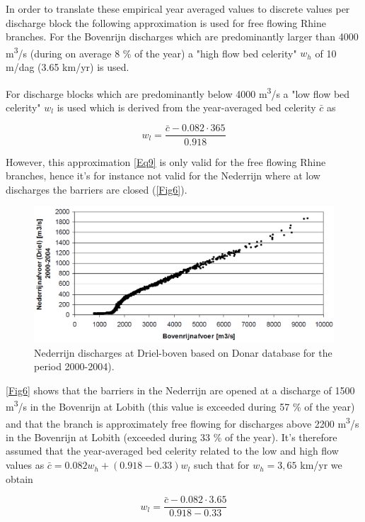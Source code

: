 In order to translate these empirical year averaged values to discrete values per discharge block the following approximation is used for free flowing Rhine branches.
For the Bovenrijn discharges which are predominantly larger than 4000 m\textsuperscript{3}/s (during on average 8 \% of the year) a "high flow bed celerity" $w_h$ of 10 m/dag (3.65 km/yr) is used.

For discharge blocks which are predominantly below 4000 m\textsuperscript{3}/s a "low flow bed celerity" $w_l$ is used which is derived from the year-averaged bed celerity $\bar{c}$ as

\begin{equation}
w_l = \frac{\bar{c} - 0.082 \cdot 365}{0.918}
\label{Eq9}
\end{equation}

However, this approximation \autoref{Eq9} is only valid for the free flowing Rhine branches, hence it's for instance not valid for the Nederrijn where at low discharges the barriers are closed (\autoref{Fig6}).

\begin{figure}
\includegraphics[width=\columnwidth]{figures/Fig6.png}
\caption{Nederrijn discharges at Driel-boven based on Donar database for the period 2000-2004).}
\label{Fig6}
\end{figure}

\autoref{Fig6} shows that the barriers in the Nederrijn are opened at a discharge of 1500 m\textsuperscript{3}/s in the Bovenrijn at Lobith (this value is exceeded during 57 \% of the year) and that the branch is approximately free flowing for discharges above 2200 m\textsuperscript{3}/s in the Bovenrijn at Lobith (exceeded during 33 \% of the year).
It's therefore assumed that the year-averaged bed celerity related to the low and high flow values as $\bar{c} = 0.082 w_h + (0.918 - 0.33) w_l$ such that for $w_h = 3,65$ km/yr we obtain

\begin{equation}
w_l = \frac{\bar{c} - 0.082 \cdot 3.65}{0.918 - 0.33}
\label{Eq10a}
\end{equation}

